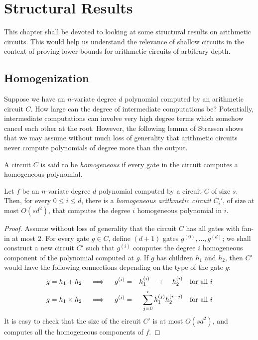 \chapter{Structural Results}\label{chap:structural-results}


This chapter shall be devoted to looking at some structural results on arithmetic circuits. 
This would help us understand the relevance of shallow circuits in the context of proving lower bounds for arithmetic circuits of arbitrary depth. 

\section{Homogenization}\label{sec:homogenization}

Suppose we have an $n$-variate degree $d$ polynomial computed by an arithmetic circuit $C$. 
How large can the degree of intermediate computations be? 
Potentially, intermediate computations can involve very high degree terms which somehow cancel each other at the root. 
However, the following lemma of Strassen shows that we may assume without much loss of generality that arithmetic circuits never compute polynomials of degree more than the output. 

\begin{definition}
A circuit $C$ is said to be \emph{homogeneous} if every gate in the circuit computes a homogeneous polynomial. 
\end{definition}

\begin{lemma}[Homogenization]\label{lem:homogenization}
Let $f$ be an $n$-variate degree $d$ polynomial computed by a circuit $C$ of size $s$. 
Then, for every $0\leq i \leq d$, there is a \emph{homogeneous arithmetic circuit} $C_i'$, of size at most $O(sd^2)$, that computes the degree $i$ homogeneous polynomial in $i$. 
\end{lemma}
\begin{proof}
Assume without loss of generality that the circuit $C$ has all gates with fan-in at most $2$. 
For every gate $g\in C$, define $(d+1)$ gates $g^{(0)},\dots, g^{(d)}$; we shall construct a new circuit $C'$ such that $g^{(i)}$ computes the degree $i$ homogeneous component of the polynomial computed at $g$. 
If $g$ has children $h_1$ and $h_2$, then $C'$ would have the following connections depending on the type of the gate $g$:
\begin{eqnarray*}
\text{$g = h_1 + h_2$}\quad\implies\quad g^{(i)} &=& h_1^{(i)} \quad + \quad h_2^{(i)}\quad\text{for all $i$}\\
\text{$g = h_1 \times h_2$}\quad\implies\quad g^{(i)} &=& \sum_{j=0}^i h_1^{(j)} h_2^{(i-j)}\quad\text{for all $i$}
\end{eqnarray*}
It is easy to check that the size of the circuit $C'$ is at most $O(sd^2)$, and computes all the homogeneous components of $f$. 
\end{proof}

